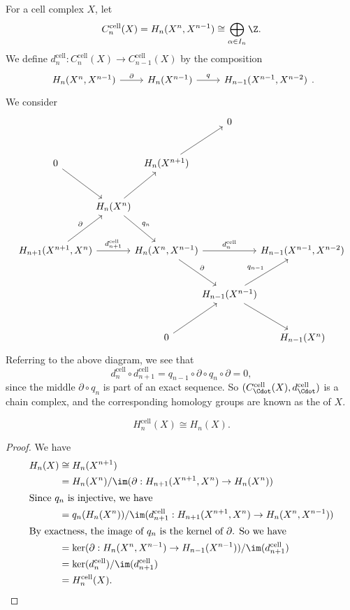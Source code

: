 \documentclass[a4paper]{article}
\begin{document}
For a cell complex $X$, let
\[
  C_n^{\mathrm{cell}}(X) = H_n(X^n, X^{n - 1}) \cong \bigoplus_{\alpha \in I_n} \Z.
\]
We define $d_n^{\mathrm{cell}}: C_n^{\mathrm{cell}}(X) \to C_{n - 1}^{\mathrm{cell}}(X)$ by the composition
\[
  \begin{tikzcd}
    H_n(X^n, X^{n - 1}) \ar[r, "\partial"] & H_n(X^{n - 1}) \ar[r, "q"] & H_{n - 1}(X^{n - 1}, X^{n - 2})
  \end{tikzcd}.
\]
We consider
\[
  \begin{tikzcd}[row sep=large, column sep=-0.5em]
    &&& 0\\
    0 \ar[dr] && H_n(X^{n + 1}) \ar[ur]\\
    &H_n(X^n) \ar[ur] \ar[dr, "q_n"]\\
    H_{n + 1}(X^{n + 1}, X^n) \ar[ur, "\partial"] \ar[rr, "d_{n + 1}^{\mathrm{cell}}"] & & H_n(X^n, X^{n - 1}) \ar[rr, "d_n^{\mathrm{cell}}"] \ar[rd, "\partial"] && H_{n - 1}(X^{n - 1}, X^{n - 2})\\
    & & & H_{n - 1}(X^{n - 1}) \ar[rd] \ar[ru, "q_{n - 1}"]\\
    & & 0 \ar[ur] & & H_{n - 1}(X^n)
  \end{tikzcd}
\]
Referring to the above diagram, we see that
\[
  d_n^{\mathrm{cell}} \circ d_{n + 1}^{\mathrm{cell}} = q_{n - 1} \circ \partial \circ q_n \circ \partial = 0,
\]
since the middle $\partial \circ q_n$ is part of an exact sequence. So $(C_{\Cdot}^{\mathrm{cell}}(X), d_{\Cdot}^{\mathrm{cell}})$ is a chain complex, and the corresponding homology groups are known as the  of $X$.

\begin{thm}
  \[
    H_n^{\mathrm{cell}}(X) \cong H_n(X).
  \]
\end{thm}

\begin{proof}
  We have
  \begin{align*}
    H_n(X) &\cong H_n(X^{n + 1}) \\
    &= H_n(X^n)/\im(\partial: H_{n + 1}(X^{n + 1}, X^n) \to H_n(X^n))\\
    \intertext{Since $q_n$ is injective, we have}
    &= q_n(H_n(X^n)) / \im(d_{n + 1}^{\mathrm{cell}}: H_{n + 1}(X^{n + 1}, X^n) \to H_n(X^n, X^{n - 1}))\\
    \intertext{By exactness, the image of $q_n$ is the kernel of $\partial$. So we have}
    &= \ker(\partial: H_n(X^n, X^{n - 1}) \to H_{n - 1}(X^{n - 1})) / \im(d_{n + 1}^{\mathrm{cell}})\\
    &= \ker(d_n^{\mathrm{cell}}) / \im(d_{n + 1}^{\mathrm{cell}})\\
    &= H_n^{\mathrm{cell}}(X).
  \end{align*}
\end{proof}
\end{document}
